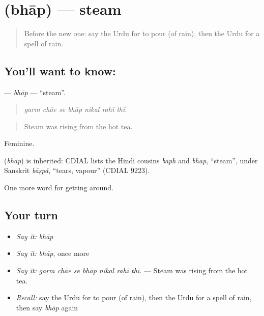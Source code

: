 \section[\texorpdfstring{\ur{بھاپ} (bhāp)}{بھاپ (bhāp)}]{ (bhāp) — steam}

\label{lesson:UR-C428-bhap}



\begin{quote}
Before the new one: say the Urdu for to pour (of rain), then the Urdu for a spell of rain.
\end{quote}

\subsection*{You'll want to know: }
\textbf{} — \emph{bhāp} — \textquotedblleft{}steam\textquotedblright{}.

\begin{quote}
      
\end{quote}

\begin{quote}
\emph{garm chāe se bhāp nikal rahī thī.}
\end{quote}

\begin{quote}
Steam was rising from the hot tea.
\end{quote}

Feminine.

\begin{cousinweb}
\textbf{} (\emph{bhāp}) is inherited: CDIAL lists the Hindi cousins \emph{bāph} and \emph{bhāp}, \textquotedblleft{}steam\textquotedblright{}, under Sanskrit \emph{bāṣpá}, \textquotedblleft{}tears, vapour\textquotedblright{} (CDIAL 9223).
\end{cousinweb}

\begin{grammarlens}[title={What you've built}]
One more word for getting around.
\end{grammarlens}

\subsection*{Your turn}
\begin{itemize}
\raggedright
  \item \emph{Say it:} \emph{bhāp}
  \item \emph{Say it:} \emph{bhāp}, once more
  \item \emph{Say it:} \emph{garm chāe se bhāp nikal rahī thī.} — Steam was rising from the hot tea.
  \item \emph{Recall:} say the Urdu for to pour (of rain), then the Urdu for a spell of rain, then say \emph{bhāp} again
\end{itemize}

